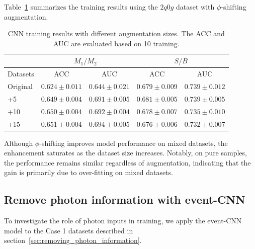 \documentclass[12pt]{article}
\begin{document}
		Table~\ref{tab:CWoLa_event_CNN_training_results_3000_jet_tagging_phi_aug_5_10_15} summarizes the training results using the $2q0g$ dataset with $\phi$-shifting augmentation.
        \begin{table}[htpb]
            \centering
            \caption{CNN training results with different augmentation sizes. The ACC and AUC are evaluated based on 10 training.}
            \label{tab:CWoLa_event_CNN_training_results_3000_jet_tagging_phi_aug_5_10_15}
            \begin{tabular}{l|cc|cc}
                         & \multicolumn{2}{c|}{$M_1 / M_2$}      & \multicolumn{2}{c}{$S / B$}           \\ \hline
                Datasets & ACC               & AUC               & ACC               & AUC               \\ \hline
                Original & $0.624 \pm 0.011$ & $0.644 \pm 0.021$ & $0.679 \pm 0.009$ & $0.739 \pm 0.012$ \\
                +5       & $0.649 \pm 0.004$ & $0.691 \pm 0.005$ & $0.681 \pm 0.005$ & $0.739 \pm 0.005$ \\
                +10      & $0.650 \pm 0.004$ & $0.692 \pm 0.004$ & $0.678 \pm 0.007$ & $0.735 \pm 0.010$ \\
                +15      & $0.651 \pm 0.004$ & $0.694 \pm 0.005$ & $0.676 \pm 0.006$ & $0.732 \pm 0.007$
            \end{tabular}
        \end{table}
		Although $\phi$-shifting improves model performance on mixed datasets, the enhancement saturates as the dataset size increases. Notably, on pure samples, the performance remains similar regardless of augmentation, indicating that the gain is primarily due to over-fitting on mixed datasets.
    \subsection{Remove photon information with event-CNN}%
    \label{sub:remove_photon_information_with_event_cnn}
        To investigate the role of photon inputs in training, we apply the event-CNN model to the Case 1 datasets described in section~\ref{sec:removing_photon_information}.
\end{document}
